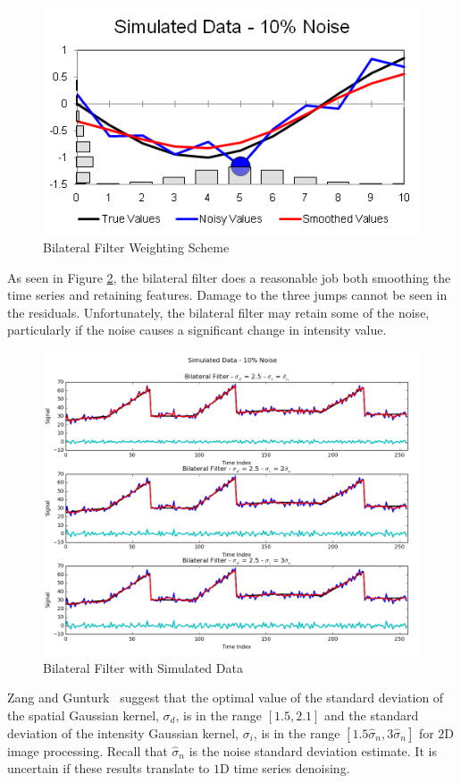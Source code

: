 \documentclass[11pt]{article}
\theoremstyle{definition}
\begin{document}
\begin{figure}[h!]
\centering
\includegraphics[width = 0.4 \textwidth]{BilateralDemo.png}
\caption{Bilateral Filter Weighting Scheme}
\label{bilateraldemo}
\end{figure}

As seen in Figure \ref{bilateralcompare}, the bilateral filter does a
reasonable job both smoothing the time series and retaining features.
Damage to the three jumps cannot be seen in the residuals.
Unfortunately, the bilateral filter may retain some of the noise,
particularly if the noise causes a significant change in intensity
value.

\begin{figure}[h!]
\centering
\includegraphics[width = 0.9 \textwidth]{BilateralCompare.png}
\caption{Bilateral Filter with Simulated Data}
\label{bilateralcompare}
\end{figure}

Zang and Gunturk~\cite{Zang08} suggest that the optimal value of the
standard deviation of the spatial Gaussian kernel, $\sigma_d$, is in
the range $\left[ 1.5, 2.1 \right]$ and the standard deviation of the
intensity Gaussian kernel, $\sigma_i$, is in the range $\left[ 1.5
  \hat{\sigma}_n, 3 \hat{\sigma}_n \right]$ for $2$D image processing. Recall that $\hat{\sigma}_n$ is the noise standard deviation estimate. It is
uncertain if these results translate to $1$D time series denoising.
\end{document}
